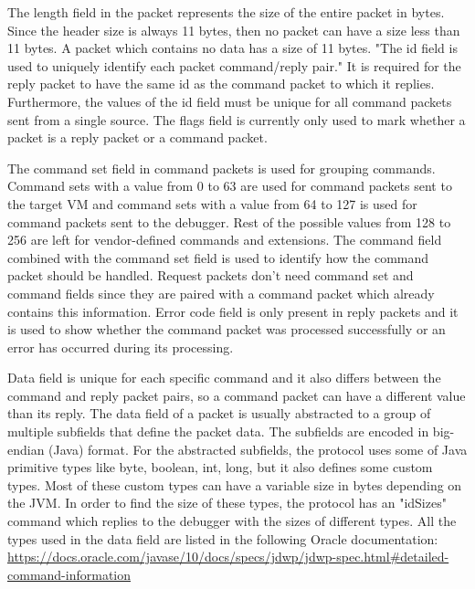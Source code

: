 \documentclass[..thesis.tex]{subfiles}
\begin{document}
The length field in the packet represents the size of the entire packet in bytes. 
Since the header size is always 11 bytes, then no packet can have a size less than 11 bytes.
A packet which contains no data has a size of 11 bytes.
"The id field is used to uniquely identify each packet command/reply pair."\cite{oracle_jdwp_spec}
It is required for the reply packet to have the same id as the command packet to which it replies.
Furthermore, the values of the id field must be unique for all command packets sent from a single source.
The flags field is currently only used to mark whether a packet is a reply packet or a command packet.

The command set field in command packets is used for grouping commands. 
Command sets with a value from 0 to 63 are used for command packets sent to the target VM and command sets with a value from 64 to 127 is used for command packets sent to the debugger. Rest of the possible values from 128 to 256 are left for vendor-defined commands and extensions.\cite{oracle_jdwp_spec}
The command field combined with the command set field is used to identify how the command packet should be handled. 
Request packets don't need command set and command fields since they are paired with a command packet which already contains this information.
Error code field is only present in reply packets and it is used to show whether the command packet was processed successfully or an error has occurred during its processing.

Data field is unique for each specific command and it also differs between the command and reply packet pairs, so a command packet can have a different value than its reply.
The data field of a packet is usually abstracted to a group of multiple subfields that define the packet data. The subfields are encoded in big-endian (Java) format.
For the abstracted subfields, the protocol uses some of Java primitive types like byte, boolean, int, long, but it also defines some custom types.
Most of these custom types can have a variable size in bytes depending on the JVM.
In order to find the size of these types, the protocol has an "idSizes" command which replies to the debugger with the sizes of different types.\cite{oracle_jdwp_spec}
All the types used in the data field are listed in the following Oracle documentation: \url{https://docs.oracle.com/javase/10/docs/specs/jdwp/jdwp-spec.html\#detailed-command-information}
\end{document}
